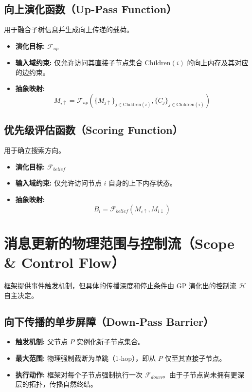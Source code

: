 \subsection{向上演化函数（Up-Pass Function）}
用于融合子树信息并生成向上传递的载荷。
\begin{itemize}
    \item \textbf{演化目标:} $\mathcal{F}_{up}$
    \item \textbf{输入域约束:} 仅允许访问其直接子节点集合 $\text{Children}(i)$ 的向上内存及其对应的边约束。
    \item \textbf{抽象映射:} 
    \[
    M_{i \uparrow} = \mathcal{F}_{up}\left( \{M_{j \uparrow}\}_{j \in \text{Children}(i)}, \{C_j\}_{j \in \text{Children}(i)} \right)
    \]
\end{itemize}

\subsection{优先级评估函数（Scoring Function）}
用于确立搜索方向。
\begin{itemize}
    \item \textbf{演化目标:} $\mathcal{F}_{belief}$
    \item \textbf{输入域约束:} 仅允许访问节点 $i$ 自身的上下内存状态。
    \item \textbf{抽象映射:} 
    \[
    B_i = \mathcal{F}_{belief}\left( M_{i \uparrow}, M_{i \downarrow} \right)
    \]
\end{itemize}

\section{消息更新的物理范围与控制流（Scope \& Control Flow）}

框架提供事件触发机制，但具体的传播深度和停止条件由 GP 演化出的控制流 $\mathcal{H}$ 自主决定。

\subsection{向下传播的单步屏障（Down-Pass Barrier）}
\begin{itemize}
    \item \textbf{触发机制:} 父节点 $P$ 实例化新子节点集合。
    \item \textbf{最大范围:} 物理强制截断为单跳（1-hop），即从 $P$ 仅至其直接子节点。
    \item \textbf{执行动作:} 框架对每个子节点强制执行一次 $\mathcal{F}_{down}$。由于子节点尚未拥有更深层的拓扑，传播自然终结。
\end{itemize}

